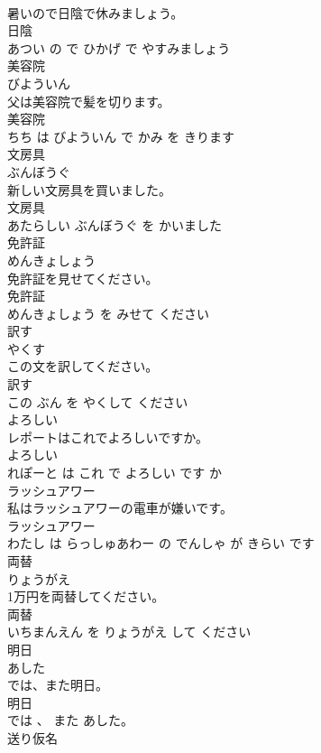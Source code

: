 \documentclass[8pt]{extreport}
\begin{document}
\begin{CJK}{UTF8}{min}
\\	暑いので日陰で休みましょう。	
\\	日陰 
\\	あつい の で ひかげ で やすみましょう			
\\	美容院	
\\	びよういん			
\\	父は美容院で髪を切ります。	
\\	美容院 
\\	ちち は びよういん で かみ を きります			
\\	文房具	
\\	ぶんぼうぐ			
\\	新しい文房具を買いました。	
\\	文房具 
\\	あたらしい ぶんぼうぐ を かいました			
\\	免許証	
\\	めんきょしょう			
\\	免許証を見せてください。	
\\	免許証 
\\	めんきょしょう を みせて ください			
\\	訳す	
\\	やくす			
\\	この文を訳してください。	
\\	訳す 
\\	この ぶん を やくして ください			
\\	よろしい	
\\	レポートはこれでよろしいですか。	
\\	よろしい 
\\	れぽーと は これ で よろしい です か			
\\	ラッシュアワー	
\\	私はラッシュアワーの電車が嫌いです。	
\\	ラッシュアワー 
\\	わたし は らっしゅあわー の でんしゃ が きらい です			
\\	両替	
\\	りょうがえ			
\\	1万円を両替してください。	
\\	両替 
\\	いちまんえん を りょうがえ して ください			
\\	明日	
\\	あした			
\\	では、また明日。	
\\	明日 
\\	では 、 また あした。			
\\	送り仮名	

\end{CJK}
\end{document}
